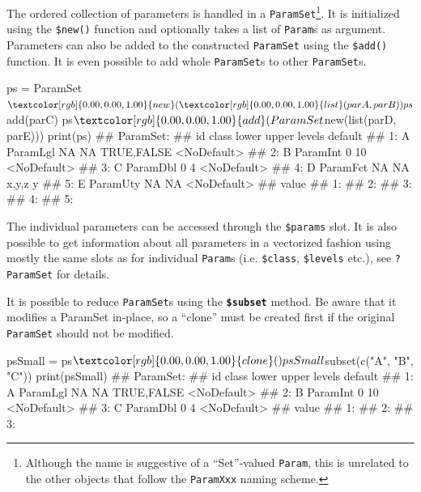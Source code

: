 \documentclass[]{article}
\newenvironment{Shaded}{}{}
\newcommand{\KeywordTok}[1]{\textcolor[rgb]{0.00,0.00,1.00}{#1}}
\newcommand{\NormalTok}[1]{#1}
\newcommand{\OperatorTok}[1]{#1}
\newcommand{\StringTok}[1]{\textcolor[rgb]{0.00,0.50,0.50}{#1}}
\renewenvironment{Shaded} {\begin{snugshade}\small} {\end{snugshade}}
\begin{document}
The ordered collection of parameters is handled in a \texttt{ParamSet}\footnote{Although the name is suggestive of a ``Set''-valued \texttt{Param}, this is unrelated to the other objects that follow the \texttt{ParamXxx} naming scheme.}.
It is initialized using the \texttt{\$new()} function and optionally takes a list of \texttt{Param}s as argument.
Parameters can also be added to the constructed \texttt{ParamSet} using the \texttt{\$add()} function.
It is even possible to add whole \texttt{ParamSet}s to other \texttt{ParamSet}s.

\begin{Shaded}
\begin{Highlighting}[]
\NormalTok{ps =}\StringTok{ }\NormalTok{ParamSet}\OperatorTok{$}\KeywordTok{new}\NormalTok{(}\KeywordTok{list}\NormalTok{(parA, parB))}
\NormalTok{ps}\OperatorTok{$}\KeywordTok{add}\NormalTok{(parC)}
\NormalTok{ps}\OperatorTok{$}\KeywordTok{add}\NormalTok{(ParamSet}\OperatorTok{$}\KeywordTok{new}\NormalTok{(}\KeywordTok{list}\NormalTok{(parD, parE)))}
\KeywordTok{print}\NormalTok{(ps)}
\NormalTok{## ParamSet: }
\NormalTok{##    id    class lower upper      levels     default}
\NormalTok{## 1:  A ParamLgl    NA    NA  TRUE,FALSE <NoDefault>}
\NormalTok{## 2:  B ParamInt     0    10             <NoDefault>}
\NormalTok{## 3:  C ParamDbl     0     4             <NoDefault>}
\NormalTok{## 4:  D ParamFct    NA    NA       x,y,z           y}
\NormalTok{## 5:  E ParamUty    NA    NA             <NoDefault>}
\NormalTok{##    value}
\NormalTok{## 1:      }
\NormalTok{## 2:      }
\NormalTok{## 3:      }
\NormalTok{## 4:      }
\NormalTok{## 5:}
\end{Highlighting}
\end{Shaded}

The individual parameters can be accessed through the \texttt{\$params} slot.
It is also possible to get information about all parameters in a vectorized fashion using mostly the same slots as for individual \texttt{Param}s (i.e. \texttt{\$class}, \texttt{\$levels} etc.), see \texttt{?ParamSet} for details.

It is possible to reduce \texttt{ParamSet}s using the \textbf{\texttt{\$subset}} method.
Be aware that it modifies a ParamSet in-place, so a ``clone'' must be created first if the original \texttt{ParamSet} should not be modified.

\begin{Shaded}
\begin{Highlighting}[]
\NormalTok{psSmall =}\StringTok{ }\NormalTok{ps}\OperatorTok{$}\KeywordTok{clone}\NormalTok{()}
\NormalTok{psSmall}\OperatorTok{$}\KeywordTok{subset}\NormalTok{(}\KeywordTok{c}\NormalTok{(}\StringTok{"A"}\NormalTok{, }\StringTok{"B"}\NormalTok{, }\StringTok{"C"}\NormalTok{))}
\KeywordTok{print}\NormalTok{(psSmall)}
\NormalTok{## ParamSet: }
\NormalTok{##    id    class lower upper      levels     default}
\NormalTok{## 1:  A ParamLgl    NA    NA  TRUE,FALSE <NoDefault>}
\NormalTok{## 2:  B ParamInt     0    10             <NoDefault>}
\NormalTok{## 3:  C ParamDbl     0     4             <NoDefault>}
\NormalTok{##    value}
\NormalTok{## 1:      }
\NormalTok{## 2:      }
\NormalTok{## 3:}
\end{Highlighting}
\end{Shaded}
\end{document}
